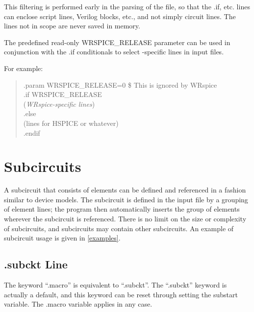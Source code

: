 This filtering is performed early in the parsing of the file, so that
the {\vt .if}, etc.  lines can enclose script lines, Verilog blocks,
etc., and not simply circuit lines.  The lines not in scope are never
saved in memory.

The predefined read-only {\vt WRSPICE\_RELEASE} parameter can be used
in conjunction with the {\vt .if} conditionals to select
{\WRspice}-specific lines in input files.

For example:
\begin{quote}\vt
.param WRSPICE\_RELEASE=0  \$ This is ignored by WRspice\\
.if WRSPICE\_RELEASE\\
({\it WRspice-specific lines\/})\\
.else\\
({\vt lines for HSPICE or whatever\/})\\
.endif
\end{quote}


\section{Subcircuits}


A subcircuit that consists of {\WRspice} elements can be defined and
referenced in a fashion similar to device models.  The subcircuit is
defined in the input file by a grouping of element lines; the program
then automatically inserts the group of elements wherever the
subcircuit is referenced.  There is no limit on the size or complexity
of subcircuits, and subcircuits may contain other subcircuits.  An
example of subcircuit usage is given in \ref{examples}.

\subsection{{\vt .subckt} Line}

The keyword ``{\vt .macro}'' is equivalent to ``{\vt .subckt}''.  The
``{\vt .subckt}'' keyword is actually a default, and this keyword can
be reset through setting the {\et substart} variable.  The {\vt
.macro} variable applies in any case.

